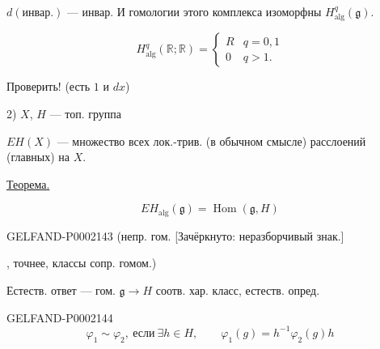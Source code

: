 $d(\text{инвар.})$ --- инвар. И гомологии этого комплекса изоморфны $H_{\mathrm{alg}}^q(\mathfrak g)$.



\begin{samepage}
\begin{equation*}H_{\mathrm{alg}}^q(\mathbb R;\mathbb R)=\begin{cases}R&q=0,1\\0&q>1.\end{cases}\end{equation*}



Проверить! (есть $1$ и $dx$)
\end{samepage}



2) $X$, $H$ --- топ. группа



$EH(X)$ --- множество всех лок.-трив. (в обычном смысле) расслоений (главных) на $X$.






\underline{Теорема.}



\begin{equation*}EH_{\mathrm{alg}}(\mathfrak g)=\operatorname{Hom}(\mathfrak g,H)\end{equation*}



\begin{GelfandAdjacentEvidence}{GELFAND-P000214}{3}
(непр. гом. [Зачёркнуто: неразборчивый знак.]
\end{GelfandAdjacentEvidence}

, точнее, классы сопр. гомом.)



Естеств. ответ --- гом. $\mathfrak g\longrightarrow H$ соотв. хар. класс, естеств. опред.



\begin{GelfandAdjacentEvidence}{GELFAND-P000214}{4}
\begin{equation*}\varphi_1\sim\varphi_2,\ \text{если}\ \exists h\in H,\qquad\varphi_1(g)=h^{-1}\varphi_2(g)h\end{equation*}
\end{GelfandAdjacentEvidence}



